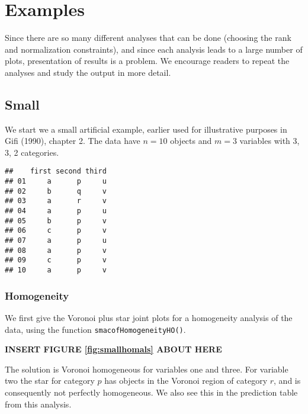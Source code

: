 \documentclass[
  12pt,
]{article}
\begin{document}
\section{Examples}\label{examples}

Since there are so many different analyses that can be done (choosing
the rank and normalization constraints), and since each analysis leads
to a large number of plots, presentation of results is a problem. We encourage readers to repeat the analyses and study the output
in more detail.

\subsection{Small}\label{small}

We start we a small artificial example, earlier used for illustrative purposes in Gifi (1990), chapter 2. The data have \(n=10\) objects and
\(m=3\) variables with 3, 3, 2 categories.

\begin{verbatim}
##    first second third
## 01     a      p     u
## 02     b      q     v
## 03     a      r     v
## 04     a      p     u
## 05     b      p     v
## 06     c      p     v
## 07     a      p     u
## 08     a      p     v
## 09     c      p     v
## 10     a      p     v
\end{verbatim}

\subsubsection{Homogeneity}\label{homogeneity}

We first give the Voronoi plus star joint plots for a homogeneity
analysis of the data, using the function \texttt{smacofHomogeneityHO()}.

\begin{greybox}

\begin{center}
\textbf{INSERT FIGURE \ref{fig:smallhomals} ABOUT HERE}

\end{center}

\end{greybox}

The solution is Voronoi homogeneous for variables one and three. For
variable two the star for category \(p\) has objects in the Voronoi
region of category \(r\), and is consequently not perfectly homogeneous.
We also see this in the prediction table from this analysis.
\end{document}
